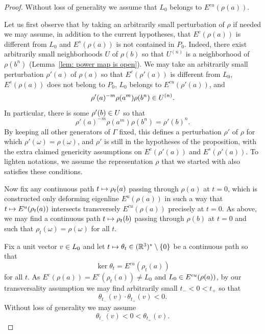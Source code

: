 \documentclass[AHL,Unicode,longabstracts]{cedram}
\newcommand{\R}{\mathbb{R}}
\newcommand{\RR}{\R}
\newcommand{\Es}{E^s}
\newcommand{\Ec}{E^c}
\newcommand{\Eu}{E^u}
\newcommand{\Ecu}{E^{cu}}
\let\oldmapsto\mapsto
\renewcommand*{\mapsto}{\mathchoice{\longmapsto}{\oldmapsto}{\oldmapsto}{\oldmapsto}}
\let\oldin\in
\renewcommand{\in}{\mathchoice{\oldin}{\oldin}{\,\oldin\,}{\,\oldin\,}}
\newcommand{\RR}{\mathbb{R}}
\begin{document}
\begin{proof}
Without loss of generality we assume that $L_0$ belongs to $\Ecu(\rho(a))$.


Let us first observe that by taking an arbitrarily small perturbation of $\rho$ if needed we may assume, in addition to the current hypotheses, that $\Ec(\rho(a))$ is different from $L_0$ and $\Es(\rho(a))$ is not contained in $P_0$. Indeed, there exist arbitrarily small neighborhoods $U$ of $\rho(b)$ so that $U^{(n)}$ is a neighborhood of $\rho(b^{n})$ (Lemma~\ref{lem: power map is open}).
We may take an arbitrarily small perturbation $\rho'(a)$ of $\rho(a)$ so that $\Ec(\rho'(a))$ is different from $L_0$, $\Es(\rho(a))$ does not belong to $P_0$, $L_0$ belongs to $\Ecu(\rho'(a))$, and
\[
\rho'(a)^{-m}\rho(a^{m})\rho(b^{n}) \in U^{(n)}.
\]
In particular, there is some $\rho'(b)\in U$ so that
\[
\rho'(a)^{-m}\rho(a^{m})\rho(b^{n})=\rho'(b)^{n}.
\]
By keeping all other generators of $\Gamma$ fixed, this defines a perturbation $\rho'$ of $\rho$ for which $\rho'(\omega)=\rho(\omega)$, and $\rho'$ is still in the hypotheses of the proposition, with the extra claimed genericity assumptions on $\Ec(\rho'(a))$ and $\Es(\rho'(a))$. To lighten notations, we assume the representation $\rho$ that we started with also satisfies these conditions.



Now fix any continuous path $t\mapsto\rho_t(a)$ passing through $\rho(a)$ at $t=0$, which is constructed only deforming eigenline $\Eu(\rho(a))$ in such a way that $t\mapsto \Eu(\rho_t(a))$ intersects transversely $\Ecu(\rho(a))$ precisely at $t=0$. As above, we may find a continuous path $t\mapsto \rho_t(b)$ passing through $\rho(b)$ at $t=0$ and such that $\rho_t(\omega)=\rho(\omega)$ for all $t$.



Fix a unit vector $v\in L_0$ and let $t\mapsto \theta_t\in(\RR^3)^*\setminus\{0\}$ be a continuous path so that
\[
\ker\theta_t=\Ecu(\rho_t(a))
\]
for all $t$.
As $\Ec(\rho(a))=\Ec(\rho_t(a))\neq L_0$ and $L_0\in\Ecu(\rho(a))$, by our transversality assumption we may find arbitrarily small $t_-<0<t_+$ so that
\[
\theta_{t_-}(v)\cdot \theta_{t_+}(v)<0.
\]
Without loss of generality we may assume
\begin{equation}\label{eq: criterion for non robust qi}
\theta_{t_-}(v)<0<\theta_{t_+}(v).
\end{equation}



\end{proof}
\end{document}
